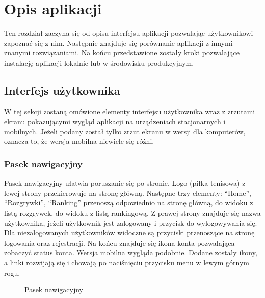 \documentclass[shortabstract]{iithesis}
\begin{document}
\chapter{Opis aplikacji}
Ten rozdział zaczyna się od opisu interfejsu aplikacji pozwalając użytkownikowi zapoznać się z nim.
Następnie znajduje się porównanie aplikacji z innymi znanymi rozwiązaniami.
Na końcu przedstawione zostały kroki pozwalające instalację aplikacji lokalnie lub w środowisku produkcyjnym.
\section{Interfejs użytkownika}
W tej sekcji zostaną omówione elementy interfejsu użytkownika wraz z zrzutami ekranu pokazującymi wygląd aplikacji na urządzeniach stacjonarnych i mobilnych.
Jeżeli podany został tylko zrzut ekranu w wersji dla komputerów, oznacza to, że wersja mobilna niewiele się różni.
\subsection{Pasek nawigacyjny}
Pasek nawigacyjny ułatwia poruszanie się po stronie. Logo (piłka tenisowa) z lewej strony przekierowuje na stronę główną.
Następne trzy elementy: ``Home'', ``Rozgrywki'', ``Ranking'' przenoszą odpowiednio na stronę główną, do widoku z listą rozgrywek, do widoku z listą rankingową.
Z prawej strony znajduje się nazwa użytkownika, jeżeli użytkownik jest zalogowany i przycisk do wylogowywania się.
Dla niezalogowanych użytkowników widoczne są przyciski przenoszące na stronę logowania oraz rejestracji.
Na końcu znajduje się ikona konta pozwalająca zobaczyć status konta. Wersja mobilna wygląda podobnie.
Dodane zostały ikony, a linki rozwijają się i chowają po naciśnięciu przycisku menu w lewym górnym rogu.

\newpage
\begin{figure}[H]
    \centering
    \hfill
    \caption{Pasek nawigacyjny}
\end{figure}
\end{document}
